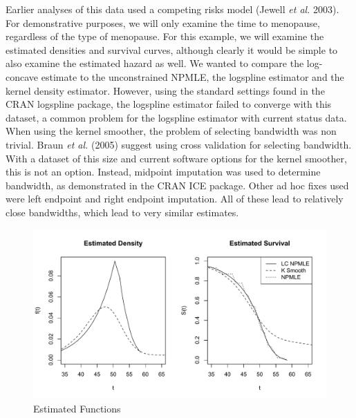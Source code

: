 \documentclass[10pt]{article}
\begin{document}
	Earlier analyses of this data used a competing risks model (Jewell \emph{et al.} 2003). For demonstrative purposes, we will only examine the time to menopause, regardless of the type of menopause. For this example, we will examine the estimated densities and survival curves, although clearly it would be simple to also examine the estimated hazard as well. We wanted to compare the log-concave estimate to the unconstrained NPMLE, the logspline estimator and the kernel density estimator. However, using the standard settings found in the CRAN logspline package, the logspline estimator failed to converge with this dataset, a common problem for the logspline estimator with current status data. When using the kernel smoother, the problem of selecting bandwidth was non trivial. Braun \emph{et al.} (2005) suggest using cross validation for selecting bandwidth. With a dataset of this size and current software options for the kernel smoother, this is not an option. Instead, midpoint imputation was used to determine bandwidth, as demonstrated in the CRAN ICE package. Other ad hoc fixes used were left endpoint and right endpoint imputation. All of these lead to relatively close bandwidths, which lead to very similar estimates. 
		
\begin{figure}[h]
\centerline{\includegraphics[width = 12cm]{MenoPlot.pdf}}
\caption{Estimated Functions}
\end{figure}		
	
\end{document}
